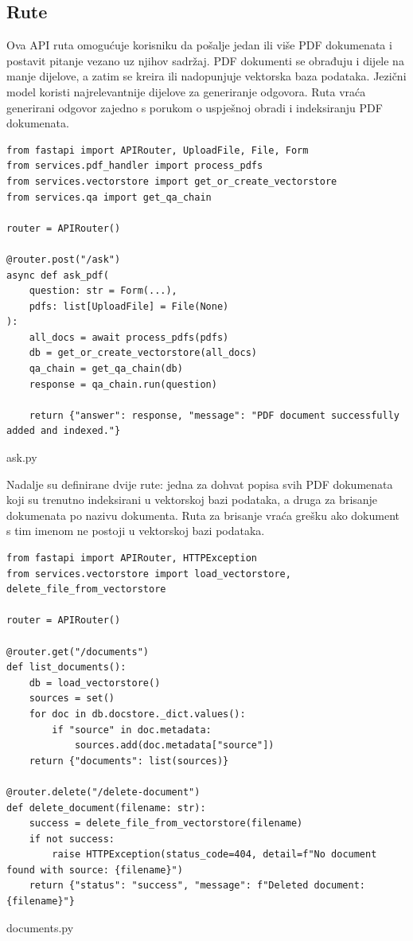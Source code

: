 \documentclass[]{foi}
\begin{document}
\subsection{Rute}
Ova API ruta omogućuje korisniku da pošalje jedan ili više PDF dokumenata i postavit pitanje vezano uz njihov sadržaj. PDF dokumenti
se obrađuju i dijele na manje dijelove, a zatim se kreira ili nadopunjuje vektorska baza podataka. Jezični model koristi najrelevantnije dijelove
za generiranje odgovora. Ruta vraća generirani odgovor zajedno s porukom o uspješnoj obradi i indeksiranju PDF dokumenata.

\begin{longlisting}
\begin{verbatim}
from fastapi import APIRouter, UploadFile, File, Form
from services.pdf_handler import process_pdfs
from services.vectorstore import get_or_create_vectorstore
from services.qa import get_qa_chain

router = APIRouter()

@router.post("/ask")
async def ask_pdf(
    question: str = Form(...),
    pdfs: list[UploadFile] = File(None)
):
    all_docs = await process_pdfs(pdfs)
    db = get_or_create_vectorstore(all_docs)
    qa_chain = get_qa_chain(db)
    response = qa_chain.run(question)

    return {"answer": response, "message": "PDF document successfully added and indexed."}
\end{verbatim}
\caption{ask.py}
\label{lst:ask}
\end{longlisting}

Nadalje su definirane dvije rute: jedna za dohvat popisa svih PDF dokumenata koji su trenutno indeksirani u vektorskoj bazi podataka, a druga
za brisanje dokumenata po nazivu dokumenta. Ruta za brisanje vraća grešku ako dokument s tim imenom ne postoji u vektorskoj bazi podataka.

\begin{longlisting}
\begin{verbatim}
from fastapi import APIRouter, HTTPException
from services.vectorstore import load_vectorstore, delete_file_from_vectorstore

router = APIRouter()

@router.get("/documents")
def list_documents():
    db = load_vectorstore()
    sources = set()
    for doc in db.docstore._dict.values():
        if "source" in doc.metadata:
            sources.add(doc.metadata["source"])
    return {"documents": list(sources)}

@router.delete("/delete-document")
def delete_document(filename: str):
    success = delete_file_from_vectorstore(filename)
    if not success:
        raise HTTPException(status_code=404, detail=f"No document found with source: {filename}")
    return {"status": "success", "message": f"Deleted document: {filename}"}
\end{verbatim}
\caption{documents.py}
\label{lst:documents}
\end{longlisting}
\end{document}
